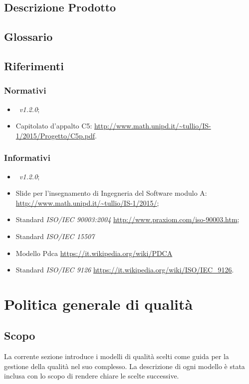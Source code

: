 \documentclass[12pt,a4paper]{article}
\begin{document}
\subsection{Descrizione Prodotto}
\descrizioneProdotto

\subsection{Glossario}
\glossarioPrint

\subsection{Riferimenti}

\subsubsection{Normativi}
\begin{itemize}
	\item \NdP\ \textit{v1.2.0};
	\item Capitolato d'appalto C5: \url{http://www.math.unipd.it/~tullio/IS-1/2015/Progetto/C5p.pdf}.
\end{itemize}

\subsubsection{Informativi}
\begin{itemize}
	\item \PdP\ \textit{v1.2.0};
	\item Slide per l'insegnamento di Ingegneria del Software modulo A: \url{http://www.math.unipd.it/~tullio/IS-1/2015/};
	\item Standard \textit{ISO/IEC 90003:2004} \url{http://www.praxiom.com/iso-90003.htm};
	\item Standard \textit{ISO/IEC 15507} 
	\item Modello Pdca \url{https://it.wikipedia.org/wiki/PDCA}
	\item Standard \textit{ISO/IEC 9126} \url{https://it.wikipedia.org/wiki/ISO/IEC_9126}.
\end{itemize}

\newpage

\section{Politica generale di qualità}
\subsection{Scopo}
La corrente sezione introduce i modelli di qualità scelti come guida per la gestione della qualità nel suo complesso. La descrizione di ogni modello è stata inclusa con lo scopo di rendere chiare le scelte successive.
\end{document}
